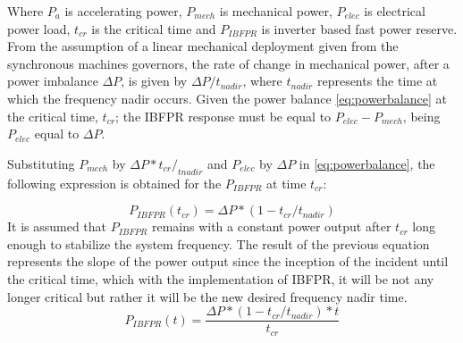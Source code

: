Where $ P_a $ is accelerating power, $ P_{mech} $ is mechanical power, $ P_{elec} $ is electrical power load, $ t_{cr} $ is the critical time and $ P_{IBFPR} $ is inverter based fast power reserve.
From the assumption of a linear mechanical deployment given from the synchronous machines governors, the rate of change in mechanical power, after a power imbalance $ \Delta P $, is given by $ \Delta P/t_{nadir} $, where $ t_{nadir} $ represents the time at which the frequency nadir occurs. Given the power balance \eqref{eq:powerbalance} at the critical time, $ t_{cr} $; the IBFPR response must be equal to $ P_{elec}-P_{mech} $, being $ P_{elec} $ equal to $ \Delta P $. %


Substituting $ P_{mech} $ by $ \Delta P* t_{cr} /_{tnadir} $ and $ P_{elec} $ by $ \Delta P $ in \eqref{eq:powerbalance}, the following expression is obtained for the $ P_{IBFPR} $ at time $ t_{cr} $:

\begin{equation}
	\label{eq:p_at_tcr}
	P_{IBFPR} (t_{cr} )=\Delta P*(1-t_{cr}/t_{nadir} )
\end{equation}
It is assumed that $ P_{IBFPR} $ remains with a constant power output after $ t_{cr} $ long enough to stabilize the system frequency. The result of the previous equation represents the slope of the power output since the inception of the incident until the critical time, which with the implementation of IBFPR, it will be not any longer critical but rather it will be the new desired frequency nadir time.
\begin{equation}
	\label{eq:IBFPR}
	P_{IBFPR} (t)=\dfrac{\Delta P*(1-t_{cr}/t_{nadir} )*t}{t_{cr}}
\end{equation}

